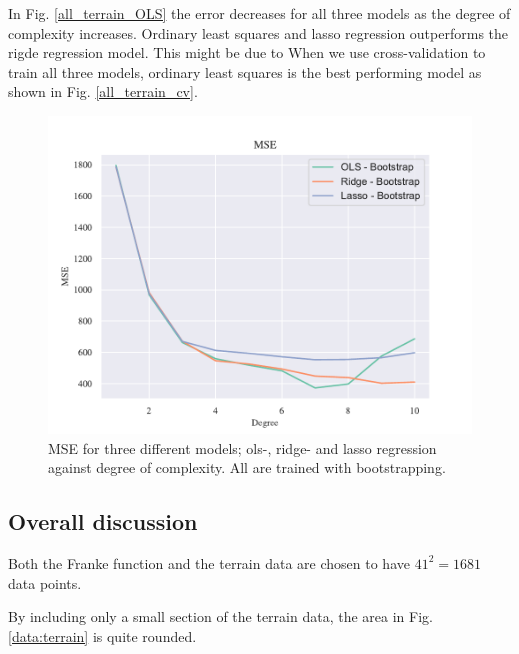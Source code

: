 In Fig. \ref{all_terrain_OLS} the error decreases for all three models as the degree of complexity increases. Ordinary least squares and lasso regression outperforms the rigde regression model. This might be due to 
When we use cross-validation to train all three models, ordinary least squares is the best performing model as shown in Fig. \ref{all_terrain_cv}. 


\begin{figure}[h!]
    \centering
    \includegraphics[width=1\linewidth]{project_1_alt/figures/figures_in_report/All_bootstrap_Terrain.pdf}
    \caption{MSE for three different models; ols-, ridge- and lasso regression against degree of complexity. All are trained with bootstrapping.}
    \label{all_terrain_bs}
\end{figure}


\subsection{Overall discussion }

Both the Franke function and the terrain data are chosen to have $41^2 = 1681$ data points. 

By including only a small section of the terrain data, the area in Fig. \ref{data:terrain} is quite rounded. 

